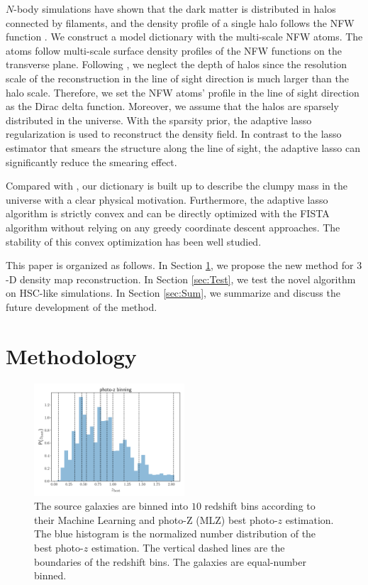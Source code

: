 \documentclass[twocolumn]{aastex62}
\begin{document}
$N$-body simulations have shown that the dark matter is distributed in halos
connected by filaments, and the density profile of a single halo follows the
NFW function \citep{halo-NFW1997ApJ}.  We construct a model dictionary with the
multi-scale NFW atoms.  The atoms follow multi-scale surface density profiles
of the NFW functions \citep{haloModel-TJ2003-3pt} on the transverse plane.
Following \citet{LSS-massMap-Glimpse3D-Leonard2014}, we neglect the depth of
halos since the resolution scale of the reconstruction in the line of sight
direction is much larger than the halo scale. Therefore, we set the NFW atoms'
profile in the line of sight direction as the Dirac delta function.  Moreover,
we assume that the halos are sparsely distributed in the universe.  With the
sparsity prior, the adaptive lasso regularization \citep{AdaLASSO-Zou2006} is
used to reconstruct the density field.  In contrast to the lasso
estimator that smears the structure along the line of sight, the adaptive lasso
can significantly reduce the smearing effect.

Compared with \citet{LSS-massMap-Glimpse3D-Leonard2014}, our dictionary is
built up to describe the clumpy mass in the universe with a clear physical
motivation. Furthermore, the adaptive lasso algorithm is strictly convex and
can be directly optimized with the FISTA algorithm \citep{FISTA-Beck2009}
without relying on any greedy coordinate descent approaches. The stability of
this convex optimization has been well studied.

This paper is organized as follows.
In Section \ref{sec:Method}, we propose the new method for $3$-D density map
reconstruction.
In Section \ref{sec:Test}, we test the novel algorithm on HSC-like simulations.
In Section \ref{sec:Sum}, we summarize and discuss the future development of
the method.

\section{Methodology}
\label{sec:Method}

\begin{figure}[!t]
 \centering
 \includegraphics[width=0.5\textwidth]{photo-z_binning.pdf}
 \caption{The source galaxies are binned into $10$ redshift bins according to
         their Machine Learning and photo-Z (MLZ) best photo-$z$ estimation. The
         blue histogram is the normalized number distribution of the best photo-$z$
         estimation. The vertical dashed lines are the boundaries of the redshift bins.
         The galaxies are equal-number binned.
        } \label{fig-bestpz}
\end{figure}
\end{document}
